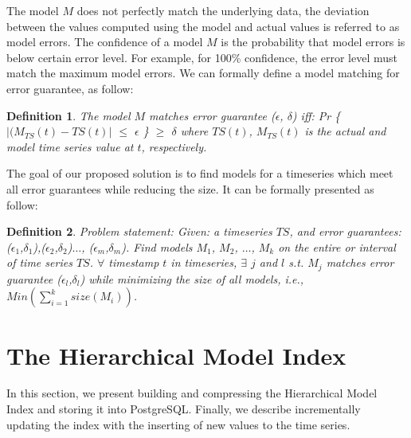\documentclass[10pt,conference,letterpaper]{IEEEtran}
\newtheorem{mydef}{Definition}
\begin{document}
The model $M$ does not perfectly match the underlying data, the deviation between the values computed using the model  and actual values is referred to as model errors. The confidence of a model $M$ is the probability that model errors is below certain error level. For example, for 100\% confidence, the error level must match the maximum model errors. We can formally define a  model matching for  error guarantee, as follow:
\begin{mydef} The model $M$ matches error guarantee ($\epsilon$, $\delta$) iff: 
Pr \{ $|(M_{TS}(t) - TS(t)|$ $\leq$ $\epsilon$ \} $\geq$ $\delta$ where $TS(t)$, $M_{TS}(t)$ is the actual and model time series value at $t$, respectively.
\end{mydef}

The goal of our proposed solution is to find models for a timeseries which meet all error guarantees while reducing the size. It can be formally presented as follow:
\begin{mydef} Problem statement: Given: a timeseries $TS$, and error guarantees: ($\epsilon_1$,$\delta_1$),($\epsilon_2$,$\delta_2$)$\dots$, ($\epsilon_m$,$\delta_m$). Find models $M_1$, $M_2$, $\dots$, $M_k$ on the entire or interval of time series $TS$. 
$\forall$ timestamp $t$ in timeseries,  $\exists$ $j$ and $l$ s.t. $M_j$ matches error guarantee ($\epsilon_l$,$\delta_l$) while minimizing the size of all models, i.e.,  $Min(\sum^k_{i=1}{size(M_i)})$.
\end{mydef}


\section{The Hierarchical Model Index}
\label{sec:building}
In this section, we present building and compressing the  Hierarchical Model Index and storing it into PostgreSQL. Finally, we describe incrementally updating the index with the inserting of new values to the time series.%
 
 
\end{document}
